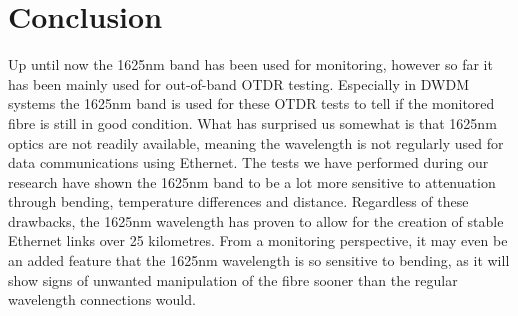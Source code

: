 \documentclass{article}
\begin{document}

\newpage
\section{Conclusion}
Up until now the 1625nm band has been used for monitoring, however so far it has been mainly used for out-of-band OTDR testing.
Especially in DWDM systems the 1625nm band is used for these OTDR tests to tell if the monitored fibre is still in good condition.
What has surprised us somewhat is that 1625nm optics are not readily available, meaning the wavelength is not regularly used for data communications using Ethernet.
The tests we have performed during our research have shown the 1625nm band to be a lot more sensitive to attenuation through bending, temperature differences and distance.
Regardless of these drawbacks, the 1625nm wavelength has proven to allow for the creation of stable Ethernet links over 25 kilometres.
From a monitoring perspective, it may even be an added feature that the 1625nm wavelength is so sensitive to bending, as it will show signs of unwanted manipulation of the fibre sooner than the regular wavelength connections would.

\newpage


\end{document}
